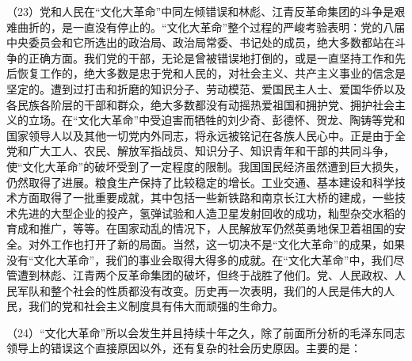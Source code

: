 （23）党和人民在“文化大革命”中同左倾错误和林彪、江青反革命集团的斗争是艰难曲折的，是一直没有停止的。“文化大革命”整个过程的严峻考验表明：党的八届中央委员会和它所选出的政治局、政治局常委、书记处的成员，绝大多数都站在斗争的正确方面。我们党的干部，无论是曾被错误地打倒的，或是一直坚持工作和先后恢复工作的，绝大多数是忠于党和人民的，对社会主义、共产主义事业的信念是坚定的。遭到过打击和折磨的知识分子、劳动模范、爱国民主人士、爱国华侨以及各民族各阶层的干部和群众，绝大多数都没有动摇热爱祖国和拥护党、拥护社会主义的立场。在“文化大革命”中受迫害而牺牲的刘少奇、彭德怀、贺龙、陶铸等党和国家领导人以及其他一切党内外同志，将永远被铭记在各族人民心中。正是由于全党和广大工人、农民、解放军指战员、知识分子、知识青年和干部的共同斗争，使“文化大革命”的破坏受到了一定程度的限制。我国国民经济虽然遭到巨大损失，仍然取得了进展。粮食生产保持了比较稳定的增长。工业交通、基本建设和科学技术方面取得了一批重要成就，其中包括一些新铁路和南京长江大桥的建成，一些技术先进的大型企业的投产，氢弹试验和人造卫星发射回收的成功，籼型杂交水稻的育成和推广，等等。在国家动乱的情况下，人民解放军仍然英勇地保卫着祖国的安全。对外工作也打开了新的局面。当然，这一切决不是“文化大革命”的成果，如果没有“文化大革命”，我们的事业会取得大得多的成就。在“文化大革命”中，我们尽管遭到林彪、江青两个反革命集团的破坏，但终于战胜了他们。党、人民政权、人民军队和整个社会的性质都没有改变。历史再一次表明，我们的人民是伟大的人民，我们的党和社会主义制度具有伟大而顽强的生命力。　

（24）“文化大革命”所以会发生并且持续十年之久，除了前面所分析的毛泽东同志领导上的错误这个直接原因以外，还有复杂的社会历史原因。主要的是：

